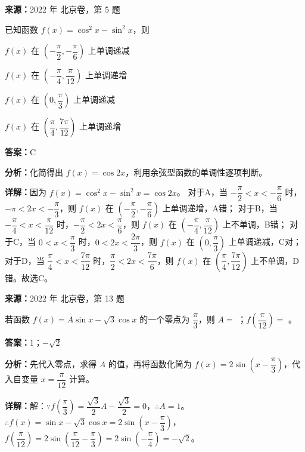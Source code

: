 \begin{question}[points=4]
\textbf{来源：}2022 年 北京卷，第 5 题\par
已知函数 $f(x) = \cos^2 x - \sin^2 x$，则
\begin{choices}
  \item $f(x)$ 在 $\left(-\dfrac{\pi}{2}, -\dfrac{\pi}{6}\right)$ 上单调递减
  \item $f(x)$ 在 $\left(-\dfrac{\pi}{4}, \dfrac{\pi}{12}\right)$ 上单调递增
  \item $f(x)$ 在 $\left(0, \dfrac{\pi}{3}\right)$ 上单调递减
  \item $f(x)$ 在 $\left(\dfrac{\pi}{4}, \dfrac{7\pi}{12}\right)$ 上单调递增
\end{choices}
\begin{solution}
\textbf{答案：}C

\textbf{分析：}化简得出 $f(x) = \cos 2x$，利用余弦型函数的单调性逐项判断。

\textbf{详解：}因为 $f(x) = \cos^2 x - \sin^2 x = \cos 2x$。
对于A，当 $-\dfrac{\pi}{2} < x < -\dfrac{\pi}{6}$ 时，$-\pi < 2x < -\dfrac{\pi}{3}$，则 $f(x)$ 在 $\left(-\dfrac{\pi}{2}, -\dfrac{\pi}{6}\right)$ 上单调递增，A错；
对于B，当 $-\dfrac{\pi}{4} < x < \dfrac{\pi}{12}$ 时，$-\dfrac{\pi}{2} < 2x < \dfrac{\pi}{6}$，则 $f(x)$ 在 $\left(-\dfrac{\pi}{4}, \dfrac{\pi}{12}\right)$ 上不单调，B错；
对于C，当 $0 < x < \dfrac{\pi}{3}$ 时，$0 < 2x < \dfrac{2\pi}{3}$，则 $f(x)$ 在 $\left(0, \dfrac{\pi}{3}\right)$ 上单调递减，C对；
对于D，当 $\dfrac{\pi}{4} < x < \dfrac{7\pi}{12}$ 时，$\dfrac{\pi}{2} < 2x < \dfrac{7\pi}{6}$，则 $f(x)$ 在 $\left(\dfrac{\pi}{4}, \dfrac{7\pi}{12}\right)$ 上不单调，D错。故选C。
\end{solution}
\end{question}

\begin{question}[points=5]
\textbf{来源：}2022 年 北京卷，第 13 题\par
若函数 $f(x) = A\sin x - \sqrt{3}\cos x$ 的一个零点为 $\dfrac{\pi}{3}$，则 $A =$ ；$f\left(\dfrac{\pi}{12}\right) =$ 。
\fillin[{$1$；$-\sqrt{2}$}]
\begin{solution}
\textbf{答案：}$1$；$-\sqrt{2}$

\textbf{分析：}先代入零点，求得 $A$ 的值，再将函数化简为 $f(x) = 2\sin\left(x - \dfrac{\pi}{3}\right)$，代入自变量 $x = \dfrac{\pi}{12}$ 计算。

\textbf{详解：}解：$\because f\left(\dfrac{\pi}{3}\right) = \dfrac{\sqrt{3}}{2}A - \dfrac{\sqrt{3}}{2} = 0$，$\therefore A = 1$。
$\therefore f(x) = \sin x - \sqrt{3}\cos x = 2\sin\left(x - \dfrac{\pi}{3}\right)$，
$f\left(\dfrac{\pi}{12}\right) = 2\sin\left(\dfrac{\pi}{12} - \dfrac{\pi}{3}\right) = 2\sin\left(-\dfrac{\pi}{4}\right) = -\sqrt{2}$。
\end{solution}
\end{question}

